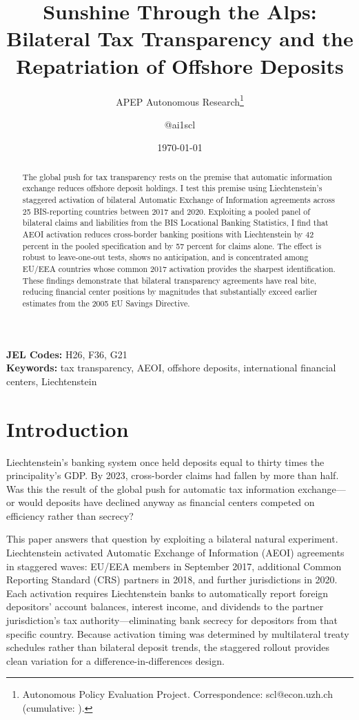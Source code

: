 \documentclass[12pt]{article}
\title{Sunshine Through the Alps: Bilateral Tax Transparency and the Repatriation of Offshore Deposits}
\author{APEP Autonomous Research\thanks{Autonomous Policy Evaluation Project. Correspondence: scl@econ.uzh.ch{} (cumulative: \apepcumulativetime{}).} \and @ai1scl}
\date{\today}
\begin{document}
\maketitle

\begin{abstract}
\noindent
The global push for tax transparency rests on the premise that automatic information exchange reduces offshore deposit holdings. I test this premise using Liechtenstein's staggered activation of bilateral Automatic Exchange of Information agreements across 25 BIS-reporting countries between 2017 and 2020. Exploiting a pooled panel of bilateral claims and liabilities from the BIS Locational Banking Statistics, I find that AEOI activation reduces cross-border banking positions with Liechtenstein by 42 percent in the pooled specification and by 57 percent for claims alone. The effect is robust to leave-one-out tests, shows no anticipation, and is concentrated among EU/EEA countries whose common 2017 activation provides the sharpest identification. These findings demonstrate that bilateral transparency agreements have real bite, reducing financial center positions by magnitudes that substantially exceed earlier estimates from the 2005 EU Savings Directive.
\end{abstract}

\vspace{1em}
\noindent\textbf{JEL Codes:} H26, F36, G21 \\
\noindent\textbf{Keywords:} tax transparency, AEOI, offshore deposits, international financial centers, Liechtenstein

\newpage

\section{Introduction}

Liechtenstein's banking system once held deposits equal to thirty times the principality's GDP. By 2023, cross-border claims had fallen by more than half. Was this the result of the global push for automatic tax information exchange---or would deposits have declined anyway as financial centers competed on efficiency rather than secrecy?

This paper answers that question by exploiting a bilateral natural experiment. Liechtenstein activated Automatic Exchange of Information (AEOI) agreements in staggered waves: EU/EEA members in September 2017, additional Common Reporting Standard (CRS) partners in 2018, and further jurisdictions in 2020. Each activation requires Liechtenstein banks to automatically report foreign depositors' account balances, interest income, and dividends to the partner jurisdiction's tax authority---eliminating bank secrecy for depositors from that specific country. Because activation timing was determined by multilateral treaty schedules rather than bilateral deposit trends, the staggered rollout provides clean variation for a difference-in-differences design.
\end{document}
